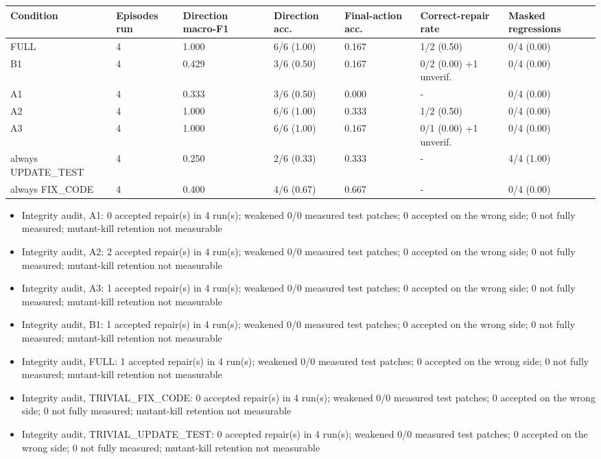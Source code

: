 \documentclass[10pt,a4paper]{article}
\begin{document}
\begin{longtable}{|>{\raggedright\arraybackslash\footnotesize}p{}>{\raggedright\arraybackslash\footnotesize}p{}>{\raggedright\arraybackslash\footnotesize}p{}>{\raggedright\arraybackslash\footnotesize}p{}>{\raggedright\arraybackslash\footnotesize}p{}>{\raggedright\arraybackslash\footnotesize}p{}>{\raggedright\arraybackslash\footnotesize}p{}|}
\hline
\textbf{Condition} & \textbf{Episodes run} & \textbf{Direction macro-F1} & \textbf{Direction acc.} & \textbf{Final-action acc.} & \textbf{Correct-repair rate} & \textbf{Masked regressions} \\ \hline\endhead
FULL & 4 & 1.000 & 6/6 (1.00) & 0.167 & 1/2 (0.50) & 0/4 (0.00) \\ \hline
B1 & 4 & 0.429 & 3/6 (0.50) & 0.167 & 0/2 (0.00) +1 unverif. & 0/4 (0.00) \\ \hline
A1 & 4 & 0.333 & 3/6 (0.50) & 0.000 & - & 0/4 (0.00) \\ \hline
A2 & 4 & 1.000 & 6/6 (1.00) & 0.333 & 1/2 (0.50) & 0/4 (0.00) \\ \hline
A3 & 4 & 1.000 & 6/6 (1.00) & 0.167 & 0/1 (0.00) +1 unverif. & 0/4 (0.00) \\ \hline
always UPDATE\_TEST & 4 & 0.250 & 2/6 (0.33) & 0.333 & - & 4/4 (1.00) \\ \hline
always FIX\_CODE & 4 & 0.400 & 4/6 (0.67) & 0.667 & - & 0/4 (0.00) \\ \hline
\end{longtable}
\begin{itemize}
\item Integrity audit, A1: 0 accepted repair(s) in 4 run(s); weakened 0/0 measured test patches; 0 accepted on the wrong side; 0 not fully measured; mutant-kill retention not measurable
\item Integrity audit, A2: 2 accepted repair(s) in 4 run(s); weakened 0/0 measured test patches; 0 accepted on the wrong side; 0 not fully measured; mutant-kill retention not measurable
\item Integrity audit, A3: 1 accepted repair(s) in 4 run(s); weakened 0/0 measured test patches; 0 accepted on the wrong side; 0 not fully measured; mutant-kill retention not measurable
\item Integrity audit, B1: 1 accepted repair(s) in 4 run(s); weakened 0/0 measured test patches; 0 accepted on the wrong side; 0 not fully measured; mutant-kill retention not measurable
\item Integrity audit, FULL: 1 accepted repair(s) in 4 run(s); weakened 0/0 measured test patches; 0 accepted on the wrong side; 0 not fully measured; mutant-kill retention not measurable
\item Integrity audit, TRIVIAL\_FIX\_CODE: 0 accepted repair(s) in 4 run(s); weakened 0/0 measured test patches; 0 accepted on the wrong side; 0 not fully measured; mutant-kill retention not measurable
\item Integrity audit, TRIVIAL\_UPDATE\_TEST: 0 accepted repair(s) in 4 run(s); weakened 0/0 measured test patches; 0 accepted on the wrong side; 0 not fully measured; mutant-kill retention not measurable
\end{itemize}
\end{document}
